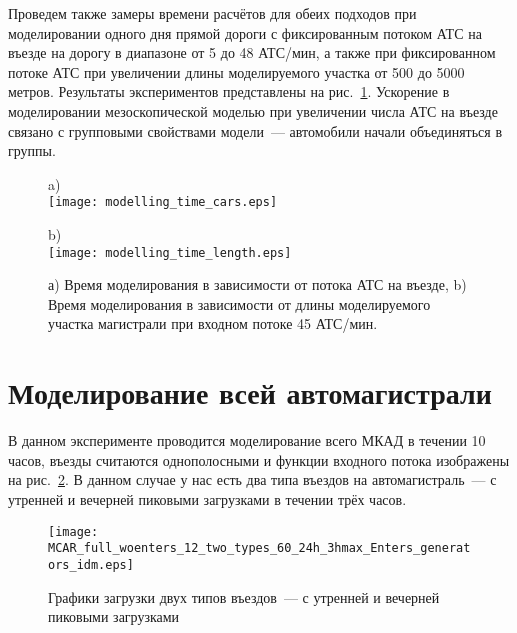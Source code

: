 Проведем также замеры времени расчётов для обеих подходов при моделировании одного дня прямой дороги с фиксированным потоком АТС на въезде на дорогу в диапазоне от 5 до 48 АТС/мин, а также при фиксированном потоке АТС при увеличении длины моделируемого участка от 500 до 5000 метров.
Результаты экспериментов представлены на рис.~\ref{fig:compare_simple_model}.
Ускорение в моделировании мезоскопической моделью при увеличении числа АТС на въезде связано с групповыми свойствами модели~--- автомобили начали объединяться в группы.
\begin{figure}[!ht]
\centering
\begin{minipage}[b]{0.49\textwidth}
    \centering
    a)
    \\ \texttt{[image: modelling\_time\_cars.eps]}
\end{minipage}
\hfill
\begin{minipage}[b]{0.49\textwidth}
    \centering
    b)
    \\ \texttt{[image: modelling\_time\_length.eps]}
\end{minipage}

\caption{а) Время моделирования в зависимости от потока АТС на въезде, b) Время моделирования в зависимости от длины моделируемого участка магистрали при входном потоке 45 АТС/мин.}
\label{fig:compare_simple_model}
\end{figure}


\section{Моделирование всей автомагистрали}
В данном эксперименте проводится моделирование всего МКАД в течении 10 часов, въезды считаются однополосными и функции входного потока изображены на рис.~\ref{fig:MCAR_flow_low_3h}.
В данном случае у нас есть два типа въездов на автомагистраль~--- с утренней и вечерней пиковыми загрузками в течении трёх часов.
\begin{figure}[!ht]
\centering
    \texttt{[image: MCAR\_full\_woenters\_12\_two\_types\_60\_24h\_3hmax\_Enters\_generators\_idm.eps]}
    \caption{Графики загрузки двух типов въездов~--- с утренней и вечерней пиковыми загрузками}
    \label{fig:MCAR_flow_low_3h}
\end{figure}

